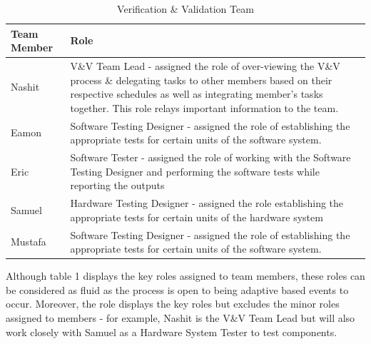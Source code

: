 \documentclass[12pt, titlepage]{article}
\begin{document}
\begin{center}
\begin{table}[H]
    \centering
    \begin{tabular}{|p{4cm}|p{9cm}|}
        \hline
        Team Member &  Role\\
        \hline
        Nashit & V\&V Team Lead - assigned the role of over-viewing the V\&V process \& delegating tasks to other members based on their respective schedules as well as integrating member’s tasks together. This role relays important information to the team.\\
        \hline
        Eamon & Software Testing Designer - assigned the role of establishing the appropriate tests for certain units of the software system.\\
        \hline
        Eric & Software Tester - assigned the role of working with the Software Testing Designer and performing the software tests while reporting the outputs\\
        \hline
        Samuel & Hardware Testing Designer - assigned the role establishing the appropriate tests for certain units of the hardware system\\
        \hline
        Mustafa & Software Testing Designer - assigned the role of establishing the appropriate tests for certain units of the software system.\\
        \hline
    \end{tabular}
    \caption{Verification \& Validation Team}
    \label{tab:my_label}
\end{table}
\end{center}
Although table 1 displays the key roles assigned to team members, these roles can be considered as fluid as the process is open to being adaptive based events to occur. Moreover, the role displays the key roles but excludes the minor roles assigned to members - for example, Nashit is the V\&V Team Lead but will also work closely with Samuel as a Hardware System Tester to test components.
\end{document}
